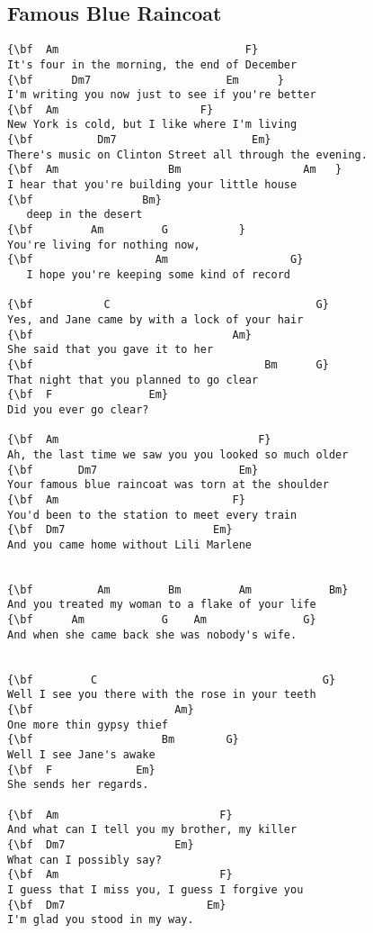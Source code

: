 \documentclass[a4paper]{article}
\begin{document}
\subsection{Famous Blue Raincoat}
\begin{Verbatim}[commandchars=\\\{\}]
{\bf  Am                             F}
It's four in the morning, the end of December
{\bf      Dm7                     Em      }
I'm writing you now just to see if you're better
{\bf  Am                      F}
New York is cold, but I like where I'm living
{\bf          Dm7                     Em}
There's music on Clinton Street all through the evening.
{\bf  Am                 Bm                   Am   }
I hear that you're building your little house
{\bf                 Bm}
   deep in the desert
{\bf         Am         G           }
You're living for nothing now,
{\bf                   Am                   G}
   I hope you're keeping some kind of record

{\bf           C                                G}
Yes, and Jane came by with a lock of your hair
{\bf                               Am}
She said that you gave it to her
{\bf                                    Bm      G}
That night that you planned to go clear
{\bf  F               Em}
Did you ever go clear?

{\bf  Am                               F}
Ah, the last time we saw you you looked so much older
{\bf       Dm7                      Em}
Your famous blue raincoat was torn at the shoulder
{\bf  Am                           F}
You'd been to the station to meet every train
{\bf  Dm7                       Em}
And you came home without Lili Marlene


{\bf          Am         Bm         Am            Bm}
And you treated my woman to a flake of your life
{\bf      Am            G    Am               G}
And when she came back she was nobody's wife.


{\bf         C                                   G}
Well I see you there with the rose in your teeth
{\bf                      Am}
One more thin gypsy thief
{\bf                    Bm        G}
Well I see Jane's awake
{\bf  F             Em}
She sends her regards.

{\bf  Am                         F}
And what can I tell you my brother, my killer
{\bf  Dm7                 Em}
What can I possibly say?
{\bf  Am                         F}
I guess that I miss you, I guess I forgive you
{\bf  Dm7                      Em}
I'm glad you stood in my way.


\end{Verbatim}
\end{document}
